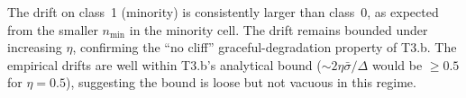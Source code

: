 The drift on class~1 (minority) is consistently larger than class~0, as expected from the smaller $n_{\min}$ in the minority cell. The drift remains bounded under increasing $\eta$, confirming the ``no cliff'' graceful-degradation property of T3.b. The empirical drifts are well within T3.b's analytical bound ($\sim 2\eta \bar\sigma / \Delta$ would be $\geq 0.5$ for $\eta = 0.5$), suggesting the bound is loose but not vacuous in this regime.
